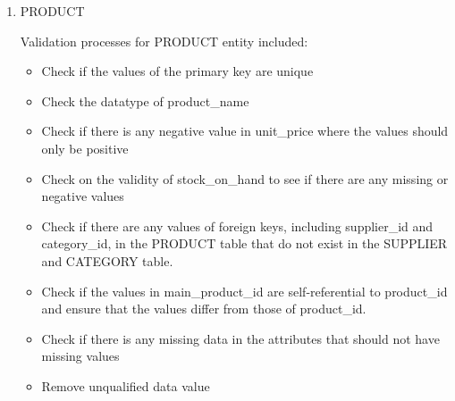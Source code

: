 \documentclass[
  letterpaper,
  DIV=11,
  numbers=noendperiod]{scrartcl}
\newenvironment{Shaded}{\begin{snugshade}}{\end{snugshade}}
\newcommand{\CommentTok}[1]{\textcolor[rgb]{0.37,0.37,0.37}{#1}}
\newcommand{\DecValTok}[1]{\textcolor[rgb]{0.68,0.00,0.00}{#1}}
\newcommand{\FunctionTok}[1]{\textcolor[rgb]{0.28,0.35,0.67}{#1}}
\newcommand{\NormalTok}[1]{\textcolor[rgb]{0.00,0.23,0.31}{#1}}
\newcommand{\OtherTok}[1]{\textcolor[rgb]{0.00,0.23,0.31}{#1}}
\newcommand{\SpecialCharTok}[1]{\textcolor[rgb]{0.37,0.37,0.37}{#1}}
\newcommand{\StringTok}[1]{\textcolor[rgb]{0.13,0.47,0.30}{#1}}
\begin{document}
\begin{enumerate}
\def\labelenumi{\arabic{enumi}.}
\setcounter{enumi}{6}
\item
  PRODUCT

  Validation processes for PRODUCT entity included:

  \begin{itemize}
  \item
    Check if the values of the primary key are unique
  \item
    Check the datatype of product\_name
  \item
    Check if there is any negative value in unit\_price where the values
    should only be positive
  \item
    Check on the validity of stock\_on\_hand to see if there are any
    missing or negative values
  \item
    Check if there are any values of foreign keys, including
    supplier\_id and category\_id, in the PRODUCT table that do not
    exist in the SUPPLIER and CATEGORY table.
  \item
    Check if the values in main\_product\_id are self-referential to
    product\_id and ensure that the values differ from those of
    product\_id.
  \item
    Check if there is any missing data in the attributes that should not
    have missing values
  \item
    Remove unqualified data value

\begin{Shaded}
\end{Shaded}
\end{itemize}
\end{enumerate}
\end{document}
